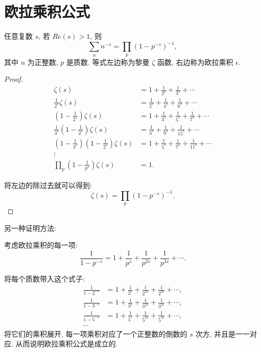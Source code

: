 \newpage

\section{欧拉乘积公式}
任意复数 $ s $, 若 $ Re(s) > 1 $, 则 
\[ \sum_n{n^{-s}} = \prod_p{(1-p^{-s})^{-1}}, \]
其中 $ n $ 为正整数, $ p $ 是质数. 等式左边称为黎曼 $ \zeta $ 函数, 右边称为欧拉乘积 $ \epsilon $.

\begin{proof}

\begin{align*}
\zeta(s) &= 1 + \frac{1}{2^s} + \frac{1}{3^s} + \cdots \\
\frac{1}{2^s}\zeta(s) &= \frac{1}{2^s} + \frac{1}{4^s} + \frac{1}{6^s} + \cdots \\
(1-\frac{1}{2^s})\zeta(s) &= 1 + \frac{1}{3^s} + \frac{1}{5^s} + \frac{1}{7^s} + \cdots \\
\frac{1}{3^s}(1-\frac{1}{2^s})\zeta(s) &= \frac{1}{3^s} + \frac{1}{9^s} + \frac{1}{15^s} + \cdots \\
(1-\frac{1}{3^s})(1-\frac{1}{2^s})\zeta(s) &= 1 + \frac{1}{5^s} + \frac{1}{7^s} + \frac{1}{11^s} + \cdots \\
 \vdots & \\
\prod_p{(1-\frac{1}{p^s})}\zeta(s) &= 1.
\end{align*}

将左边的除过去就可以得到:
\[ 
\zeta(s) = \prod_p{(1-p^{-s})^{-1}}.
\]
\end{proof}

另一种证明方法:

考虑欧拉乘积的每一项:
\[ \frac{1}{1-p^{-s}} = 1 + \frac{1}{p^s} + \frac{1}{p^{2s}} + \frac{1}{p^{3s}} + \cdots. \]

将每个质数带入这个式子:
\begin{align*}
\frac{1}{1-2^{-s}} &= 1 + \frac{1}{2^s} + \frac{1}{2^{2s}} + \frac{1}{2^{3s}} + \cdots, \\ 
\frac{1}{1-3^{-s}} &= 1 + \frac{1}{3^s} + \frac{1}{3^{2s}} + \frac{1}{3^{3s}} + \cdots, \\ 
\frac{1}{1-5^{-s}} &= 1 + \frac{1}{5^s} + \frac{1}{5^{2s}} + \frac{1}{5^{3s}} + \cdots, \\ 
\cdots & 
\end{align*}
将它们的乘积展开, 每一项乘积对应了一个正整数的倒数的 $ s $ 次方, 并且是一一对应. 从而说明欧拉乘积公式是成立的.

\newpage
